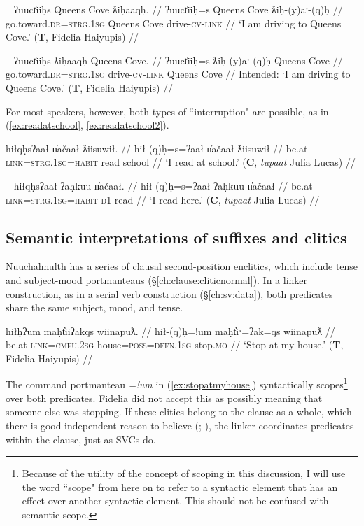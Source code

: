 \ex~ \label{ex:fhqc}
\begingl
\glpreamble ʔuuct̓iiḥs Queens Cove ƛiḥaaqḥ. //
\gla ʔuuct̓iiḥ=s Queens Cove ƛiḥ-(y)aˑ-(q)ḥ //
\glb go.toward.\textsc{dr}=\textsc{strg.1sg} Queens Cove drive-\textsc{cv}-\textsc{link} //
\glft `I am driving to Queens Cove.' (\textbf{T}, Fidelia Haiyupis) //
\endgl
\xe

\ex~ \label{*ex:fhqc}
\begingl
\glpreamble *ʔuuct̓iiḥs ƛiḥaaqḥ Queens Cove. //
\gla ʔuuct̓iiḥ=s ƛiḥ-(y)aˑ-(q)ḥ Queens Cove //
\glb go.toward.\textsc{dr}=\textsc{strg.1sg} drive-\textsc{cv}-\textsc{link} Queens Cove //
\glft Intended: `I am driving to Queens Cove.' (\textbf{T}, Fidelia Haiyupis) //
\endgl
\xe

\noindent For most speakers, however, both types of ``interruption" are possible, as in (\ref{ex:readatschool}, \ref{ex:readatschool2}).

\ex \label{ex:readatschool}
\begingl
\glpreamble hiłqḥsʔaał n̓ačaał ƛiisuwił. //
\gla hił-(q)ḥ=s=ʔaał n̓ačaał ƛiisuwił //
\glb be.at-\textsc{link}=\textsc{strg.1sg}=\textsc{habit} read school //
\glft `I read at school.' (\textbf{C}, \textit{tupaat} Julia Lucas) //
\endgl
\xe

\ex~ \label{ex:readatschool2}
\begingl
\glpreamble hiłqḥsʔaał ʔaḥkuu n̓ačaał. //
\gla hił-(q)ḥ=s=ʔaał ʔaḥkuu n̓ačaał //
\glb be.at-\textsc{link}=\textsc{strg.1sg}=\textsc{habit} \textsc{d1} read //
\glft `I read here.' (\textbf{C}, \textit{tupaat} Julia Lucas) //
\endgl
\xe

\subsection{Semantic interpretations of suffixes and clitics} \label{ch:link:second}

Nuuchahnulth has a series of clausal second-position enclitics, which include tense and subject-mood portmanteaus (\S\ref{ch:clause:cliticnormal}). In a linker construction, as in a serial verb construction (\S\ref{ch:sv:data}), both predicates share the same subject, mood, and tense.

\ex \label{ex:stopatmyhouse}
\begingl
\glpreamble hiłḥʔum maḥt̓iiʔakqs wiinapuƛ. //
\gla hił-(q)ḥ=!um maḥt̓iˑ=ʔak=qs wiinapuƛ //
\glb be.at-\textsc{link}=\textsc{cmfu.2sg} house=\textsc{poss}=\textsc{defn.1sg} stop.\textsc{mo} //
\glft `Stop at my house.' (\textbf{T}, Fidelia Haiyupis) //
\endgl
\xe

The command portmanteau \textit{=!um} in (\ref{ex:stopatmyhouse}) syntactically scopes\footnote{Because of the utility of the concept of scoping in this discussion, I will use the word ``scope" from here on to refer to a syntactic element that has an effect over another syntactic element. This should not be confused with semantic scope.} over both predicates. Fidelia did not accept this as possibly meaning that someone else was stopping. If these clitics belong to the clause as a whole, which there is good independent reason to believe (\citealt[p.~35--36]{rose1981}; \citealt[p.~42--50]{woo2007b}), the linker coordinates predicates within the clause, just as SVCs do.

